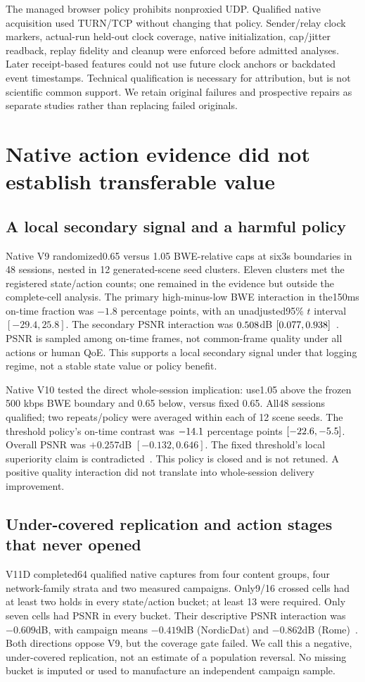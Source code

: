 \documentclass[10pt]{article}
\begin{document}
The managed browser policy prohibits nonproxied UDP. Qualified native acquisition
used TURN/TCP without changing that policy. Sender/relay clock markers,
actual-run held-out clock coverage, native initialization, cap/jitter readback,
replay fidelity and cleanup were enforced before admitted analyses. Later
receipt-based features could not use future clock anchors or backdated event
timestamps. Technical qualification is necessary for attribution, but is not
scientific common support. We retain original failures and prospective repairs
as separate studies rather than replacing failed originals.

\section{Native action evidence did not establish transferable value}
\subsection{A local secondary signal and a harmful policy}
Native V9 randomized0.65 versus 1.05 BWE-relative caps at six3s boundaries in 48
sessions, nested in 12 generated-scene seed clusters. Eleven clusters met the
registered state/action counts; one remained in the evidence but outside the
complete-cell analysis. The primary high-minus-low BWE interaction in the150ms
on-time fraction was $-1.8$ percentage points, with an unadjusted95\% $t$ interval
$[-29.4,25.8]$. The secondary PSNR interaction was
$0.508{}$dB $[0.077{},0.938{}]$~\cite{v9}.
PSNR is sampled among on-time frames, not common-frame quality under all actions
or human QoE. This supports a local secondary signal under that logging regime,
not a stable state value or policy benefit.

Native V10 tested the direct whole-session implication: use1.05 above the frozen
500 kbps BWE boundary and 0.65 below, versus fixed 0.65. All48 sessions qualified;
two repeats/policy were averaged within each of 12 scene seeds. The threshold
policy's on-time contrast was $-14.1{}$ percentage points
$[-22.6{},-5.5{}]$. Overall PSNR was $+0.257$dB $[-0.132,0.646]$.
The fixed threshold's local superiority claim is contradicted~\cite{v10}.
This policy is closed and is not retuned. A positive quality interaction did not
translate into whole-session delivery improvement.

\subsection{Under-covered replication and action stages that never opened}
V11D completed64 qualified native captures from four content groups, four
network-family strata and two measured campaigns. Only9/16 crossed cells had
at least two holds in every state/action bucket; at least 13 were required.
Only seven cells had PSNR in every bucket. Their descriptive PSNR interaction
was $-0.609$dB, with campaign means $-0.419$dB (NordicDat) and $-0.862$dB
(Rome)~\cite{v11d}. Both directions oppose V9, but the coverage gate failed.
We call this a negative, under-covered replication, not an estimate of a
population reversal. No missing bucket is imputed or used to manufacture an
independent campaign sample.
\end{document}
